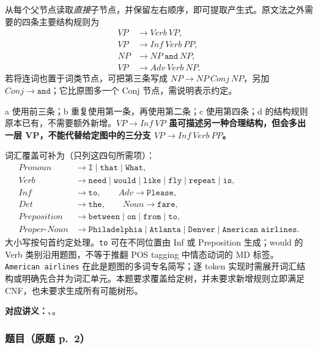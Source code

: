 \begin{checkedsolution}
从每个父节点读取\emph{直接}子节点，并保留左右顺序，即可提取产生式。原文法之外需要的四条主要结构规则为
\[
\boxed{\begin{aligned}
VP&\rightarrow Verb\ VP,\\
VP&\rightarrow Inf\ Verb\ PP,\\
NP&\rightarrow NP\ \texttt{and}\ NP,\\
VP&\rightarrow Adv\ Verb\ NP.
\end{aligned}}
\]
若将连词也置于词类节点，可把第三条写成 $NP\rightarrow NP\ Conj\ NP$，另加 $Conj\rightarrow\texttt{and}$；它比原图多一个 Conj 节点，需说明表示约定。

a 使用前三条；b 重复使用第一条，再使用第二条；c 使用第四条；d 的结构规则原本已有，不需要额外新增。\textbf{$VP\rightarrow Inf\ VP$ 虽可描述另一种合理结构，但会多出一层 VP，不能代替给定图中的三分支 $VP\rightarrow Inf\ Verb\ PP$。}

词汇覆盖可补为（只列这四句所需项）：
\[
\begin{aligned}
Pronoun&\rightarrow\texttt{I}\mid\texttt{that}\mid\texttt{What},\\
Verb&\rightarrow\texttt{need}\mid\texttt{would}\mid\texttt{like}\mid
       \texttt{fly}\mid\texttt{repeat}\mid\texttt{is},\\
Inf&\rightarrow\texttt{to},\qquad Adv\rightarrow\texttt{Please},\\
Det&\rightarrow\texttt{the},\qquad Noun\rightarrow\texttt{fare},\\
Preposition&\rightarrow\texttt{between}\mid\texttt{on}\mid\texttt{from}\mid\texttt{to},\\
Proper\text{-}Noun&\rightarrow\texttt{Philadelphia}\mid\texttt{Atlanta}\mid\texttt{Denver}
                   \mid\texttt{American airlines}.
\end{aligned}
\]
大小写按句首约定处理。\texttt{to} 可在不同位置由 Inf 或 Preposition 生成；would 的 Verb 类别沿用题图，不等于推翻 POS tagging 中情态动词的 MD 标签。\texttt{American airlines} 在此是题图的多词专名简写；逐 token 实现时需展开词汇结构或明确先合并为词汇单元。本题要求覆盖给定树，并未要求新增规则立即满足 CNF，也未要求生成所有可能树形。
\end{checkedsolution}


\textbf{对应讲义：}、。

\subsubsection*{题目（原题 p.~2）}

